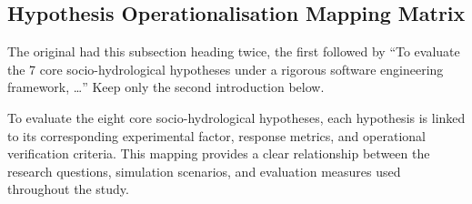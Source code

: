 \documentclass{article}
\begin{document}
\subsection{Hypothesis Operationalisation Mapping Matrix}
\begin{removed}
The original had this subsection heading twice, the first followed by ``To evaluate the 7 core socio-hydrological hypotheses under a rigorous software engineering framework, \ldots'' Keep only the second introduction below.
\end{removed}

\begin{changed}
To evaluate the eight core socio-hydrological hypotheses, each hypothesis is linked to its corresponding experimental factor, response metrics, and operational verification criteria. This mapping provides a clear relationship between the research questions, simulation scenarios, and evaluation measures used throughout the study.


\end{changed}
\end{document}
